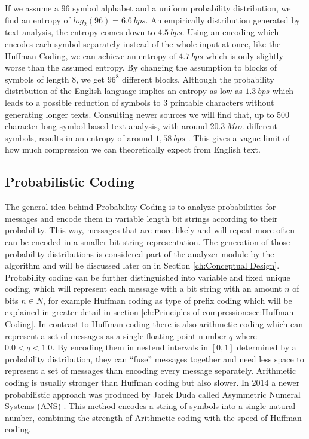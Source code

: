 \par {
If we assume a 96 symbol alphabet and a uniform probability distribution, we find an entropy of $log_2 (96) = 6.6 \: bps$. An empirically distribution generated by text analysis, the entropy comes down to $4.5 \: bps$. Using an encoding which encodes each symbol separately instead of the whole input at once, like the Huffman Coding, we can achieve an entropy of $4.7 \: bps$ which is only slightly worse than the assumed entropy. By changing the assumption to blocks of symbols of length 8, we get $96^8$ different blocks. Although the probability distribution of the English language implies an entropy as low as $1.3 \: bps$ which leads to a possible reduction of symbols to 3 printable characters without generating longer texts. Consulting newer sources we will find that, up to 500 character long symbol based text analysis, with around $20.3 \: Mio.$ different symbols, results in an entropy of around $1,58 \: bps$ \cite{entropy-new}. This gives a vague limit of how much compression we can theoretically expect from English text.}


\subsection{Probabilistic Coding}
\par{
The general idea behind Probability Coding is to analyze probabilities for messages and encode them in variable length bit strings according to their probability. This way, messages that are more likely and will repeat more often can be encoded in a smaller bit string representation. The generation of those probability distributions is considered part of the analyzer module by the algorithm and will be discussed later on in Section \ref{ch:Conceptual Design}. Probability coding can be further distinguished into variable and fixed unique coding, which will represent each message with a bit string with an amount $n$ of bits $n \in N$, for example Huffman coding as type of prefix coding which will be explained in greater detail in section \ref{ch:Principles of compression:sec:Huffman Coding}. In contrast to Huffman coding there is also arithmetic coding which can represent a set of messages as a single floating point number $q$ where $0.0 < q < 1.0$. By encoding them in nestend intervals in $[0,1]$ determined by a probability distribution, they can \enquote{fuse} messages together and need less space to represent a set of messages than encoding every message separately. Arithmetic coding is usually stronger than Huffman coding but also slower. In 2014 a newer probabilistic approach was produced by Jarek Duda called Asymmetric Numeral Systems (ANS) \cite{DBLP:journals/corr/Duda13}. This method encodes a string of symbols into a single natural number, combining the strength of Arithmetic coding with the speed of Huffman coding.
}

